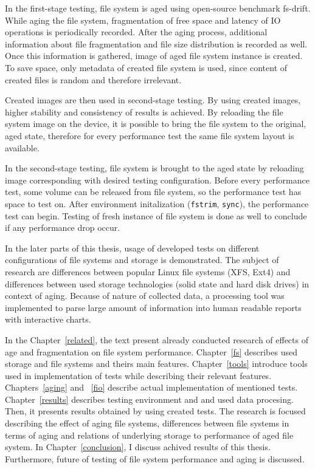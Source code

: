 \documentclass[
  color, %
  table, %
  lof,   %
  lot,   %
]{fithesis3}
\begin{document}
In the first-stage testing, file system is aged using open-source benchmark fs-drift. While aging the file system, fragmentation of free space and latency of IO operations is periodically recorded. After the aging process, additional information about file fragmentation and file size distribution is recorded as well. Once this information is gathered, image of aged file system instance is created. To save space, only metadata of created file system is used, since content of created files is random and therefore irrelevant.

Created images are then used in second-stage testing. By using created images, higher stability and consistency of results is achieved. By reloading the file system image on the device, it is possible to bring the file system to the original, aged state, therefore for every performance test the same file system layout is available.

In the second-stage testing, file system is brought to the aged state by reloading image corresponding with desired testing configuration. Before every performance test, some volume can be released from file system, so the performance test has space to test on. After environment initalization (\texttt{fstrim}, \texttt{sync}), the performance test can begin. Testing of fresh instance of file system is done as well to conclude if any performance drop occur.

In the later parts of this thesis, usage of developed tests on different configurations of file systems and storage is demonstrated. The subject of research are differences between popular Linux file systems (XFS, Ext4) and differences between used storage technologies (solid state and hard disk drives) in context of aging. Because of nature of collected data, a processing tool was implemented to parse large amount of information into human readable reports with interactive charts.

In the Chapter~\ref{related}, the text present already conducted research of effects of age and fragmentation on file system performance. Chapter~\ref{fs} describes used storage and file systems and theirs main features. Chapter~\ref{tools} introduce tools used in implementation of tests while describing their relevant features. Chapters~\ref{aging} and ~\ref{fio} describe actual implementation of mentioned tests. Chapter~\ref{results} describes testing environment and and used data procesing. Then, it presents results obtained by using created tests. The research is focused describing the effect of aging file systems, differences between file systems in terms of aging and relations of underlying storage to performance of aged file system. In Chapter~\ref{conclusion}, I discuss achived results of this thesis. Furthermore, future of testing of file system performance and aging is discussed.
\end{document}
